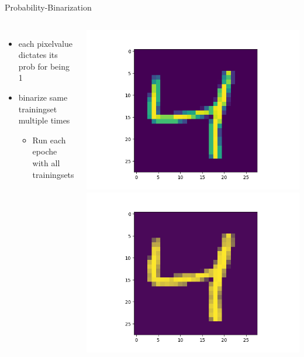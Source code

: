 \documentclass[aspectratio=1610, 12pt]{beamer}
\begin{document}
\begin{frame}{Probability-Binarization}
	\begin{columns}
		\begin{itemize}
			\item each pixelvalue dictates its prob for being 1
			\item binarize same trainingset multiple times
			\begin{itemize}
				\item Run each epoche with all trainingsets
			\end{itemize}
		\end{itemize}
		\centering
  		\includegraphics[width=.6\linewidth]{./images/comparison/default}
  		\includegraphics[width=.6\linewidth]{./images/comparison/overlapped}

	\end{columns}
\end{frame}
\end{document}
